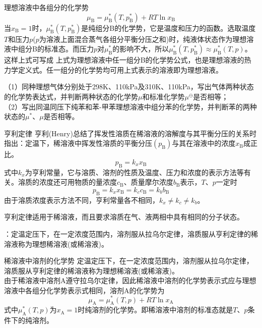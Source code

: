 \begin{frame}{理想溶液中各组分的化学势}
    \[
        \mu_\mathrm{B}= \mu_{\mathrm{B}}^*(T,p_\mathrm{B}^*) +R T \ln x_\mathrm{B}
    \]
    当$x_\mathrm{B}=1$时，$\mu_{\mathrm{B}}^*(T,p_\mathrm{B}^*)$是纯组分B的化学势，它是温度和压力的函数。选取温度$T$和压力$p$($p$为溶液上面混合蒸气各组分平衡分压之和)时，纯液体状态作为理想溶液中组分B的标准态。而压力$p$对$\mu_{\mathrm{B}}^*$的影响不大，所以$\mu_{\mathrm{B}}^*(T,p_\mathrm{B}^*) \approx \mu_{\mathrm{B}}^*(T,p)$。这样上式可写成
    上式为理想溶液中任一组分B的化学势公式，也是理想溶液的热力学定义式。任一组分的化学势均可用上式表示的溶液即为理想溶液。
\end{frame}


\begin{frame}[t]{}
    \begin{example}
        （1）同种理想气体分别处于298K、110kPa及310K、110kPa，写出气体两种状态的化学势表达式，并判断两种状态的化学势$\mu$和标准化学势$\mu^\ominus$是否相等；
        \\（2）写出同温同压下纯苯和苯-甲苯理想溶液中组分苯的化学势，并判断苯的两种状态的$\mu^*$、$\mu$是否相等。
    \end{example}
\end{frame}


\begin{frame}{亨利定律}
    亨利(Henry)总结了挥发性溶质在稀溶液的溶解度与其平衡分压的关系时指出：定温下，稀溶液中挥发性溶质的平衡分压$(p_\mathrm{B})$与其在溶液中的浓度$x_\mathrm{B}$成正比。
    $$p_\mathrm{B}=k_x x_\mathrm{B}$$
    式中$k_x$为亨利常量，它与溶质、溶剂的性质及温度、压力和浓度的表示方法等有关。溶质的浓度还可用物质的量浓度$c_\mathrm{B}$、质量摩尔浓度$b_\mathrm{B}$表示，$T$、$p$一定时
    $$p_\mathrm{B}=k_x x_\mathrm{B}=k_c c_\mathrm{B}=k_b b_\mathrm{B}$$
    由于溶质浓度表示方法不同，亨利常量各不相同，$k_x\neq k_c \neq k_b$。
    
    亨利定律适用于{\color{red}稀溶液}，而且要求溶质在气、液两相中具有相同的分子状态。
    
    ：定温定压下，在一定浓度范围内，溶剂服从拉乌尔定律，溶质服从亨利定律的稀溶液称为理想稀溶液(或稀溶液)。
\end{frame}


\begin{frame}{稀溶液中溶剂的化学势}
    定温定压下，在一定浓度范围内，溶剂服从拉乌尔定律，溶质服从亨利定律的稀溶液称为理想稀溶液(或稀溶液)。
    \\由于稀溶液中溶剂A遵守拉乌尔定律，因此稀溶液中溶剂的化学势表示式应与理想溶液中各组分化学势表示式相同，溶剂A的化学势为
    $$\mu_\mathrm{A}=\mu_{\mathrm{A}}^*(T,p)+R T \ln x_\mathrm{A}$$
    式中$\mu_{\mathrm{A}}^*(T,p)$为$x_\mathrm{A}=1$时纯溶剂的化学势。即稀溶液中溶剂的标准态就是$T$、$p$条件下的纯溶剂。
\end{frame}



